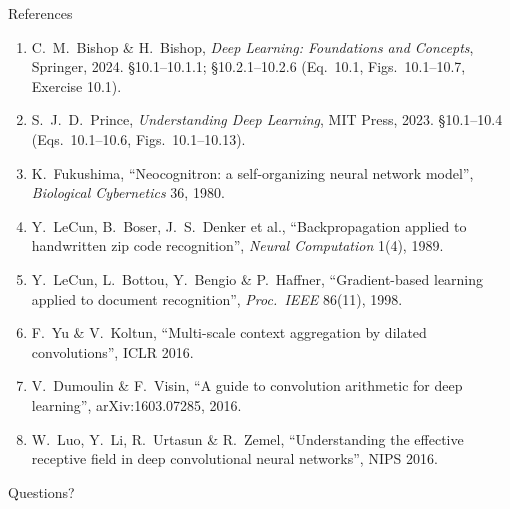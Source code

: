 \documentclass[aspectratio=169, 11pt]{beamer}
\begin{document}
\begin{frame}[allowframebreaks]{References}
  \vspace{0.3em}
  {\scriptsize
  \begin{enumerate}\itemsep0.30em
    \item C.\ M.\ Bishop \& H.\ Bishop, \emph{Deep Learning: Foundations
          and Concepts}, Springer, 2024. \S10.1--10.1.1;
          \S10.2.1--10.2.6 (Eq.~10.1, Figs.~10.1--10.7,
          Exercise 10.1).
    \item S.\ J.\ D.\ Prince, \emph{Understanding Deep Learning}, MIT
          Press, 2023. \S10.1--10.4 (Eqs.~10.1--10.6,
          Figs.~10.1--10.13).
    \item K.\ Fukushima, ``Neocognitron: a self-organizing neural
          network model'', \emph{Biological Cybernetics} 36, 1980.
    \item Y.\ LeCun, B.\ Boser, J.\ S.\ Denker et al., ``Backpropagation
          applied to handwritten zip code recognition'', \emph{Neural
          Computation} 1(4), 1989.
    \item Y.\ LeCun, L.\ Bottou, Y.\ Bengio \& P.\ Haffner,
          ``Gradient-based learning applied to document recognition'',
          \emph{Proc.\ IEEE} 86(11), 1998.
    \item F.\ Yu \& V.\ Koltun, ``Multi-scale context aggregation by
          dilated convolutions'', ICLR 2016.
    \item V.\ Dumoulin \& F.\ Visin, ``A guide to convolution arithmetic
          for deep learning'', arXiv:1603.07285, 2016.
    \item W.\ Luo, Y.\ Li, R.\ Urtasun \& R.\ Zemel, ``Understanding the
          effective receptive field in deep convolutional neural
          networks'', NIPS 2016.
  \end{enumerate}}
\end{frame}

\begin{frame}[standout]
  Questions?
\end{frame}
\end{document}
